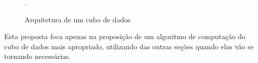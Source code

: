 \begin{figure}[ht]
	\caption{Arquitetura de um cubo de dados}
	\vspace{6mm}
	\begin{center}
	\end{center}
	\vspace{2mm}
	\legenda{}
	.
	\label{fig:cubearch}
\end{figure}

Esta proposta foca apenas na proposição de um algoritmo de computação do cubo de dados mais apropriado, utilizando das outras seções quando elas vão se tornando necessárias.

